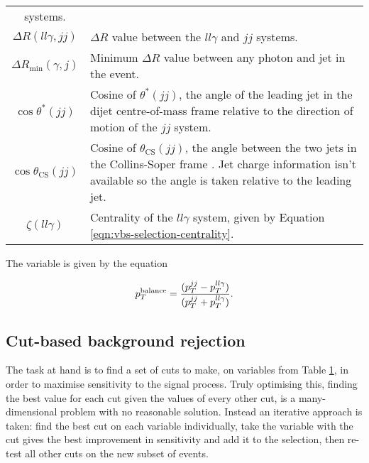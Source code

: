 \begin{table}[!p]
\begin{tabular}{c|p{10cm}}
    systems.
    \\
    $\Delta R(ll\gamma, jj)$ &
    $\Delta R$ value between the $ll\gamma$ and $jj$ systems.
    \\
    $\Delta R_\text{min}(\gamma, j)$ &
    Minimum $\Delta R$ value between any photon and jet in the event.
    \\
    $\cos{\theta^*(jj)}$ &
    Cosine of $\theta^*(jj)$, the angle of the leading jet in the dijet
    centre-of-mass frame relative to the direction of motion of the $jj$ system.
    \\
    $\cos{\theta_\text{CS}(jj)}$ &
    Cosine of $\theta_\text{CS}(jj)$, the angle between the two jets in the
    Collins-Soper frame \cite{Collins1977}. Jet charge information isn't
    available so the angle is taken relative to the leading jet.
    \\
    $\zeta(ll\gamma)$ &
    Centrality of the $ll\gamma$ system, given by Equation
    \ref{eqn:vbs-selection-centrality}.
    \\
    \hline\hline
  \end{tabular}
  \label{tab:vzy-bdt-variables}
\end{table}

The variable \ptbalance is given by the equation

\begin{equation}
  p_T^\text{balance} = \frac{ (p_T^{jj} - p_T^{ll\gamma}) }
                    { (p_T^{jj} + p_T^{ll\gamma}) }.
  \label{eqn:vzy-bdt-ptbalance}
\end{equation}

\subsection{Cut-based background rejection}

The task at hand is to find a set of cuts to make, on variables from Table
\ref{tab:vzy-bdt-variables}, in order to maximise sensitivity to the signal
process. Truly optimising this, finding the best value for each cut given the
values of every other cut, is a many-dimensional problem with no reasonable
solution. Instead an iterative approach is taken: find the best cut on each
variable individually, take the variable with the cut gives the best improvement
in sensitivity and add it to the selection, then re-test all other cuts on the
new subset of events.

